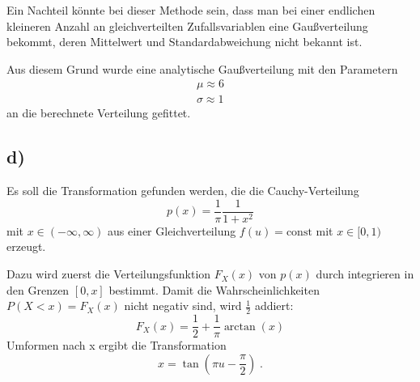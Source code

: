     Ein Nachteil könnte bei dieser Methode sein, dass man bei einer endlichen kleineren Anzahl an gleichverteilten Zufallsvariablen eine Gaußverteilung bekommt, deren Mittelwert und Standardabweichung nicht bekannt ist.

    Aus diesem Grund wurde eine analytische Gaußverteilung mit den Parametern
    \begin{align*}
        \mu \approx 6 \\
        \sigma \approx 1
    \end{align*}
    an die berechnete Verteilung gefittet.


\subsection{d)}
    Es soll die Transformation gefunden werden, die die Cauchy-Verteilung
    \begin{equation}
        p(x) = \frac{1}{\pi} \frac{1}{1 + x^2}
    \end{equation}
    mit $x \in (-\infty, \infty)$ aus einer Gleichverteilung $f(u)=\mathrm{const}$ mit $x \in [0, 1)$ erzeugt.

    Dazu wird zuerst die Verteilungsfunktion $F_X(x)$ von $p(x)$ durch integrieren in den Grenzen $[0, x]$ bestimmt.
    Damit die Wahrscheinlichkeiten $P(X < x) = F_X(x)$ nicht negativ sind, wird $\frac{1}{2}$ addiert:
    \begin{equation}
        F_X(x) = \frac{1}{2} + \frac{1}{\pi} \arctan(x)
    \end{equation}
    Umformen nach x ergibt die Transformation
    \begin{equation}
        x = \tan(\pi u - \frac{\pi}{2}) \;.
    \end{equation}

